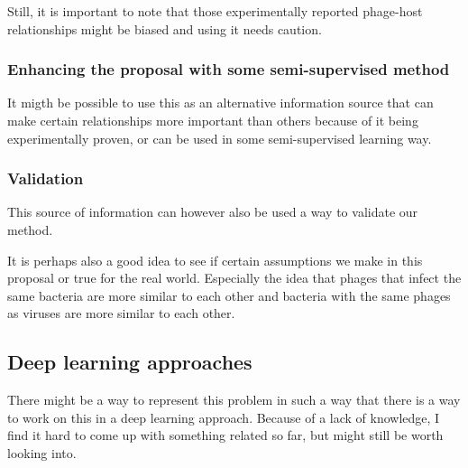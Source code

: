 \documentclass{article}
\begin{document}
Still, it is important to note that those experimentally reported phage-host
relationships might be biased and using it needs caution.

\subsubsection{Enhancing the proposal with some semi-supervised method}
It migth be possible to use this as an alternative information source that
can make certain relationships more important than others because
of it being experimentally proven, or can be used in some semi-supervised
learning way.

\subsubsection{Validation}

This source of information can however also be used a way to validate
our method. 

It is perhaps also a good idea to see if certain assumptions we make in 
this proposal or true for the real world. 
Especially the idea that phages that infect the same
bacteria are more similar to each other and bacteria with the same phages
as viruses are more similar to each other.

\subsection{Deep learning approaches}

There might be a way to represent this problem in such a way that there is a 
way to work on this in a deep learning approach. Because of a lack of knowledge, 
I find it hard to come up with something related so far, but might still
be worth looking into.

\printbibliography{}
\end{document}
